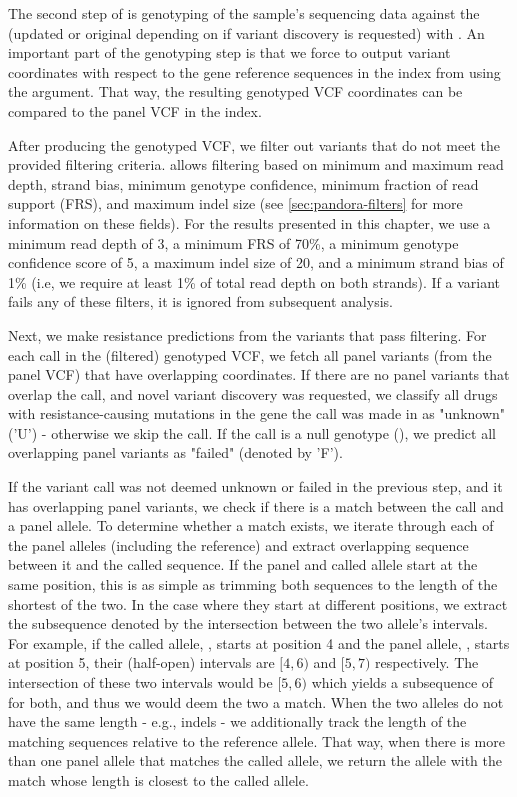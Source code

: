 The second step of  is genotyping of the sample's sequencing data against the \prg{} (updated or original depending on if variant discovery is requested) with \pandora{} . An important part of the genotyping step is that we force \pandora{} to output variant coordinates with respect to the gene reference sequences in the index from  using the  argument. That way, the resulting genotyped VCF coordinates can be compared to the panel VCF in the index. 

After producing the \pandora{} genotyped VCF, we filter out variants that do not meet the provided filtering criteria. \drprg{}  allows filtering based on minimum and maximum read depth, strand bias, minimum genotype confidence, minimum fraction of read support (FRS), and maximum indel size (see \autoref{sec:pandora-filters} for more information on these fields). For the results presented in this chapter, we use a minimum read depth of 3, a minimum FRS of 70\%, a minimum genotype confidence score of 5, a maximum indel size of 20, and a minimum strand bias of 1\% (i.e, we require at least 1\% of total read depth on both strands). If a variant fails any of these filters, it is ignored from subsequent analysis.

Next, we make resistance predictions from the variants that pass filtering. For each call in the (filtered) genotyped VCF, we fetch all panel variants (from the panel VCF) that have overlapping coordinates. If there are no panel variants that overlap the call, and novel variant discovery was requested, we classify all drugs with resistance-causing mutations in the gene the call was made in as "unknown" ('U') - otherwise we skip the call. If the call is a null genotype (), we predict all overlapping panel variants as "failed" (denoted by 'F').

If the variant call was not deemed unknown or failed in the previous step, and it has overlapping panel variants, we check if there is a match between the call and a panel allele. To determine whether a match exists, we iterate through each of the panel alleles (including the reference) and extract overlapping sequence between it and the called sequence. If the panel and called allele start at the same position, this is as simple as trimming both sequences to the length of the shortest of the two. In the case where they start at different positions, we extract the subsequence denoted by the intersection between the two allele's intervals. For example, if the called allele, , starts at position 4 and the panel allele, , starts at position 5, their (half-open) intervals are $[4,6)$ and $[5,7)$ respectively. The intersection of these two intervals would be $[5,6)$ which yields a subsequence of  for both, and thus we would deem the two a match. When the two alleles do not have the same length - e.g., indels - we additionally track the length of the matching sequences relative to the reference allele. That way, when there is more than one panel allele that matches the called allele, we return the allele with the match whose length is closest to the called allele.

